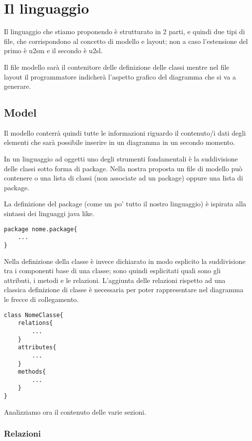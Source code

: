 \chapter{Il linguaggio}

Il linguaggio che stiamo proponendo è strutturato in 2 parti, e quindi due tipi di
file, che corrispondono al concetto di modello e layout; non a caso l'estensione
del primo è u2sm e il secondo è u2sl.

Il file modello sarà il contenitore delle definizione delle classi mentre nel
file layout il programmatore indicherà l'aspetto grafico del diagramma che si va
a generare.

\section{Model}

Il modello conterrà quindi tutte le informazioni riguardo il contenuto/i dati
degli elementi che sarà possibile inserire in un diagramma in un secondo
momento. 

In un linguaggio ad oggetti uno degli strumenti fondamentali è la suddivisione 
delle classi sotto forma di package. Nella nostra proposta un file di modello
può contenere o una lista di classi (non associate ad un package) oppure una
lista di package.

La definizione del package (come un po' tutto il nostro linguaggio) è 
ispirata alla sintassi dei linguaggi java like.

\begin{lstlisting}[caption={Dichiarazione di package}, style={model}]
package nome.package{
	...  	
}
\end{lstlisting}

Nella definizione della classe è invece dichiarato in modo esplicito la
suddivisione tra i componenti base di una classe; sono quindi esplicitati quali
sono gli attributi, i metodi e le relazioni. L'aggiunta delle relazioni rispetto
ad una classica definizione di classe è necessaria per poter rappresentare nel
diagramma le frecce di collegamento.


\begin{lstlisting}[caption={Dichiarazione di classe}, style={model}]
class NomeClasse{
	relations{
		...
	}
	attributes{
		...
	}
	methods{
		...
	}
}
\end{lstlisting}

Analizziamo ora il contenuto delle varie sezioni.

\subsection{Relazioni}


